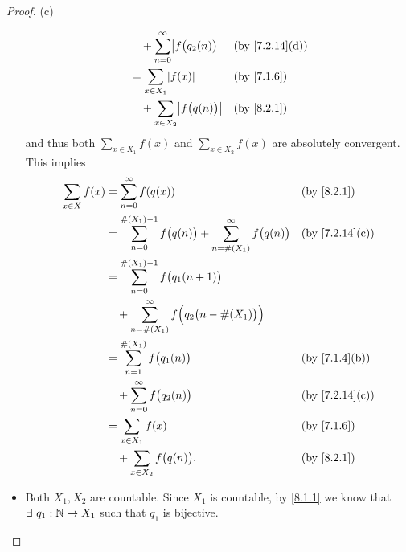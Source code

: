 \begin{proof}{(c)}
\begin{itemize}
\begin{align*}
                                      & \quad + \sum_{n = 0}^\infty \abs{f\big(q_2(n)\big)}                                                  &  & \text{(by \cref{7.2.14}(d))} \\
                                      & = \sum_{x \in X_1} \abs{f(x)}                                                                        &  & \text{(by \cref{7.1.6})}     \\
                                      & \quad + \sum_{x \in X_2} \abs{f\big(q(n)\big)}                                                       &  & \text{(by \cref{8.2.1})}
          \end{align*}
          and thus both \(\sum_{x \in X_1} f(x)\) and \(\sum_{x \in X_2} f(x)\) are absolutely convergent.
          This implies
          \begin{align*}
            \sum_{x \in X} f(x) & = \sum_{n = 0}^\infty f(q(x))                                                            &  & \text{(by \cref{8.2.1})}     \\
                                & = \sum_{n = 0}^{\#(X_1) - 1} f\big(q(n)\big) + \sum_{n = \#(X_1)}^\infty f\big(q(n)\big) &  & \text{(by \cref{7.2.14}(c))} \\
                                & = \sum_{n = 0}^{\#(X_1) - 1} f\big(q_1(n + 1)\big)                                                                         \\
                                & \quad + \sum_{n = \#(X_1)}^\infty f\Big(q_2\big(n - \#(X_1)\big)\Big)                                                      \\
                                & = \sum_{n = 1}^{\#(X_1)} f\big(q_1(n)\big)                                               &  & \text{(by \cref{7.1.4}(b))}  \\
                                & \quad + \sum_{n = 0}^\infty f\big(q_2(n)\big)                                            &  & \text{(by \cref{7.2.14}(c))} \\
                                & = \sum_{x \in X_1} f(x)                                                                  &  & \text{(by \cref{7.1.6})}     \\
                                & \quad + \sum_{x \in X_2} f\big(q(n)\big).                                                &  & \text{(by \cref{8.2.1})}
          \end{align*}
    \item Both \(X_1, X_2\) are countable.
          Since \(X_1\) is countable, by \cref{8.1.1} we know that \(\exists\ q_1 : \mathbb{N} \to X_1\) such that \(q_1\) is bijective.

\end{itemize}
\end{proof}

